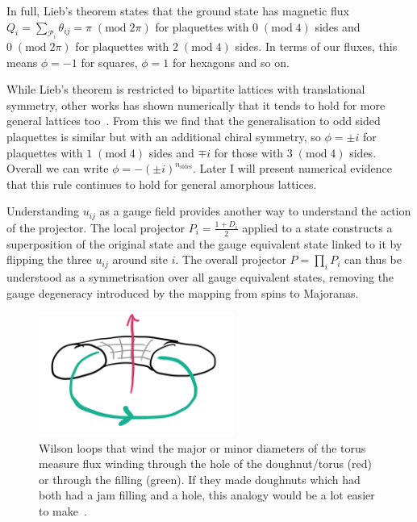 In full, Lieb's theorem states that the ground state has magnetic flux \(Q_i = \sum_{\mathcal{P}_i}\theta_{ij} = \pi \; (\mathrm{mod} \;2\pi)\) for plaquettes with \(0 \; (\mathrm{mod}\;4)\) sides and \(0 \; (\mathrm{mod}\;2\pi)\) for plaquettes with \(2 \; (\mathrm{mod}\;4)\) sides. In terms of our fluxes, this means \(\phi = -1\) for squares, \(\phi = 1\) for hexagons and so on.

While Lieb's theorem is restricted to bipartite lattices with translational symmetry, other works has shown numerically that it tends to hold for more general lattices too~\autocite{eschmannThermodynamicClassificationThreedimensional2020,Yao2009,eschmann2019thermodynamics,Peri2020}. From this we find that the generalisation to odd sided plaquettes is similar but with an additional chiral symmetry, so \(\phi = \pm i\) for plaquettes with \(1 \; (\mathrm{mod}\;4)\) sides and \(\mp i\) for those with \(3 \; (\mathrm{mod}\;4)\) sides. Overall we can write \(\phi = -(\pm i)^{n_{\mathrm{sides}}}\). Later I will present numerical evidence that this rule continues to hold for general amorphous lattices.

Understanding \(u_{ij}\) as a gauge field provides another way to understand the action of the projector. The local projector \(P_i = \frac{1 + D_i}{2}\) applied to a state constructs a superposition of the original state and the gauge equivalent state linked to it by flipping the three \(u_{ij}\) around site \(i\). The overall projector \(P = \prod_i P_i\) can thus be understood as a symmetrisation over all gauge equivalent states, removing the gauge degeneracy introduced by the mapping from spins to Majoranas.

\hypertarget{fig:topological_fluxes}{%
\begin{figure}
\centering
\includegraphics[width=0.57\textwidth,height=\textheight]{figure_code/amk_chapter/topological_fluxes.png}
\caption[{Topological Fluxes}]{Wilson loops that wind the major or minor diameters of the torus measure flux winding through the hole of the doughnut/torus (red) or through the filling (green). If they made doughnuts which had both had a jam filling and a hole, this analogy would be a lot easier to make~\autocite{parkerWhyDoesThis}.}
\label{fig:topological_fluxes}
\end{figure}
}

